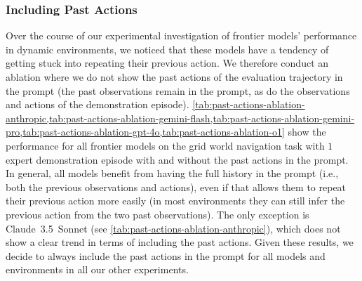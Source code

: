 \documentclass{article}
\newcommand{\ie}{i.e., }
\newcommand{\claude}{Claude~3.5~Sonnet}
\begin{document}
\subsubsection{Including Past Actions}
\label{app:additional-results:past-actions-ablation}
Over the course of our experimental investigation of frontier models' performance in dynamic environments, we noticed that these models have a tendency of getting stuck into repeating their previous action.
We therefore conduct an ablation where we do not show the past actions of the evaluation trajectory in the prompt (the past observations remain in the prompt, as do the observations and actions of the demonstration episode).
\cref{tab:past-actions-ablation-anthropic,tab:past-actions-ablation-gemini-flash,tab:past-actions-ablation-gemini-pro,tab:past-actions-ablation-gpt-4o,tab:past-actions-ablation-o1} show the performance for all frontier models on the grid world navigation task with $1$ expert demonstration episode with and without the past actions in the prompt.
In general, all models benefit from having the full history in the prompt (\ie both the previous observations and actions), even if that allows them to repeat their previous action more easily (in most environments they can still infer the previous action from the two past observations).
The only exception is \claude{} (see \cref{tab:past-actions-ablation-anthropic}), which does not show a clear trend in terms of including the past actions.
Given these results, we decide to always include the past actions in the prompt for all models and environments in all our other experiments.
\end{document}
